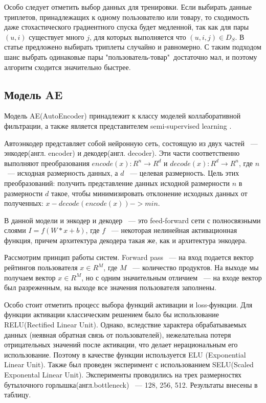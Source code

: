 \documentclass[14pt]{mmcs_article}
\begin{document}
Особо следует отметить выбор данных для тренировки. Если выбирать данные триплетов, принадлежащих к одному пользователю или товару, то сходимость даже стохастического градиентного спуска будет медленной, так как для пары $(u,i)$ существует много $j$, для которых выполняется что $(u,i,j) \in D_S$. В статье \cite{BPR:1205} предложено выбирать триплеты случайно и равномерно. С таким подходом шанс выбрать одинаковые пары "пользователь-товар"\ достаточно мал, и поэтому алгоритм сходится значительно быстрее.

\subsection{ Модель AE}
Модель AE(AutoEncoder) принадлежит к классу моделей коллаборативной фильтрации, а также является представителем semi-supervised learning \cite{AE:a1}. 

Автоэнкодер представляет собой нейронную сеть, состоящую из двух частей ~--- энкодер(англ. encoder) и декодер(англ. decoder). Эти части соответственно выполняют преобразования  $encode(x) : R^n \rightarrow R^d$ и $decode(x) : R^d \rightarrow R^n$, где $n$ ~--- исходная размерность данных, а $d$ ~--- целевая размерность. Цель этих преобразований: получить представление данных исходной размерности $n$ в размерности $d$ такое, чтобы минимизировать отклонение исходных данных от полученных: $x - decode(encode(x)) -> min$.

В данной модели и энкодер и декодер ~--- это feed-forward сети с полносвязными слоями $I = f(W*x + b)$, где $f$ ~--- некоторая нелинейная активационная функция, причем архитектура декодера такая же, как и архитектура энкодера. 

Рассмотрим принцип работы систем. Forward pass ~--- на вход подается вектор рейтингов пользователя $x \in R^M$, где $M$ ~--- количество продуктов. На выходе мы получаем вектор $x \in R^M$, но с одним значительным отличием ~--- на входе вектор был разреженным, на выходе все значения пользователя заполнены.

Особо стоит отметить процесс выбора функций активации и loss-функции. Для функции активации классическим решением было бы использование RELU(Rectified Linear Unit). Однако, вследствие характера обрабатываемых данных (неявная обратная связь от пользователей), нежелательна потеря отрицательных значений после активации, что делает нерациональным его использование. Поэтому в качестве функции используется ELU (Exponential Linear Unit). Также был проведен эксперимент с использованием SELU(Scaled Exponental Linear Unit). Эксперименты проводились на трех размерностях бутылочного горлышка(англ.bottleneck) ~--- 128, 256, 512. Результаты внесены в таблицу.\\
\end{document}
